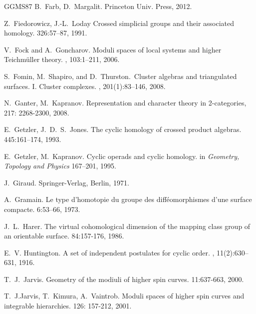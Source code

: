 \documentclass[english,11pt,leqno]{article}
\theoremstyle{definition}
\theoremstyle{remark}
\numberwithin{equation}{section}
\begin{document}
\begin{thebibliography}{GGMS87}
 B.~Farb, D.~Margalit.
\newblock Princeton Univ. Press, 2012. 

 
  
 Z.~Fiedorowicz, J.-L.~Loday
\newblock Crossed simplicial groups and their associated homology.
 326:57--87, 1991.

V.~Fock and A.~Goncharov.
\newblock Moduli spaces of local systems and higher {T}eichm\"uller theory.
, 103:1--211, 2006.

S.~Fomin, M.~Shapiro, and D.~Thurston.\
 \newblock Cluster algebras and triangulated surfaces. {I}. {C}luster complexes.
\newblock {\em Acta Math.}, 201(1):83--146, 2008.


 N.~Ganter, M.~Kapranov. 
\newblock
 Representation and character theory in 2-categories, 
  217:  2268-2300, 2008. 

E.~Getzler, J.~D.~S.~Jones.
\newblock The cyclic homology of crossed product algebras.
 445:161--174, 1993. 

 E.~Getzler, M.~Kapranov.
 \newblock Cyclic operads and cyclic homology. 
 \newblock in {\em Geometry, Topology and Physics} 167--201, 1995.
 
  J.~Giraud.
 \newblock Springer-Verlag, Berlin, 1971.

A.~Gramain.
\newblock Le type d'homotopie du groupe des diff\'eomorphismes d'une
              surface compacte.
 6:53--66, 1973. 
 
  J.~L.~Harer.
 \nb The virtual cohomological dimension of the mapping class group of
 an orientable surface.
  84:157-176, 1986. 

E.~V. Huntington.
\newblock A set of independent postulates for cyclic order.
, 11(2):630--631, 1916.

 T.~J.~Jarvis.
\newblock Geometry of the modiuli of higher spin curves.
 11:637-663, 2000.

 T.~J.Jarvis, T.~Kimura, 
A.~Vaintrob. \newblock
Moduli spaces of higher spin curves and integrable hierarchies.
 126: 157-212, 2001. 


\end{thebibliography}
\end{document}
